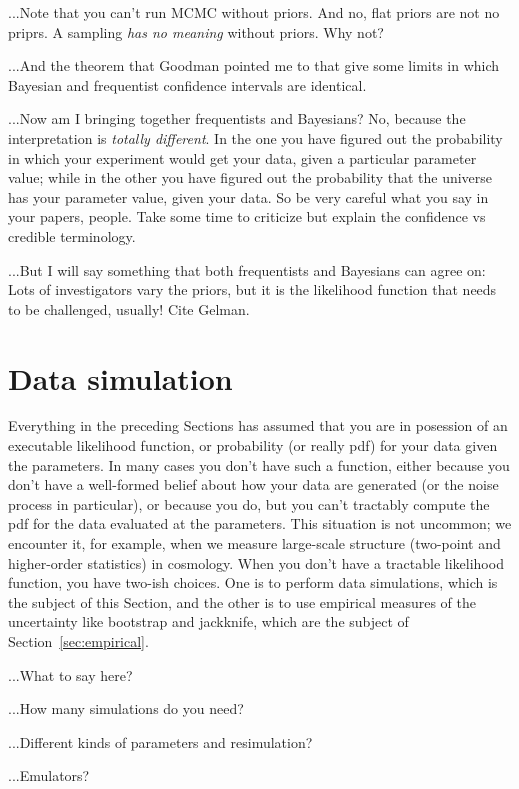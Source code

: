 \documentclass[10pt]{article}
\newcommand{\sectionname}{Section}
\begin{document}
...Note that you can't run MCMC without priors. And no, flat priors are not no
priprs. A sampling \emph{has no meaning} without priors. Why not?

...And the theorem that Goodman pointed me to that give some limits in which
Bayesian and frequentist confidence intervals are identical.

...Now am I bringing together frequentists and Bayesians? No, because the
interpretation is \emph{totally different}. In the one you have figured out the
probability in which your experiment would get your data, given a particular
parameter value; while in the other you have figured out the probability that
the universe has your parameter value, given your data. So be very careful
what you say in your papers, people. Take some time to criticize but explain the
confidence vs credible terminology.

...But I will say something that both frequentists and Bayesians can agree on:
Lots of investigators vary the priors, but it is the likelihood function
that needs to be challenged, usually! Cite Gelman.

\section{Data simulation}\label{sec:simulation}

Everything in the preceding \sectionname s has assumed that you are in posession
of an executable likelihood function, or probability (or really pdf)
for your data given the parameters.
In many cases you don't have such a function, either because you don't have
a well-formed belief about how your data are generated (or the noise process
in particular), or because you do, but you can't tractably compute the
pdf for the data evaluated at the parameters.
This situation is not uncommon; we encounter it, for example,
when we measure large-scale structure (two-point and higher-order statistics)
in cosmology.
When you don't have a tractable likelihood function, you have two-ish choices.
One is to perform data simulations, which is the subject of this \sectionname,
and the other is to use empirical measures of the uncertainty like bootstrap and
jackknife, which are the subject of \sectionname~\ref{sec:empirical}.

...What to say here?

...How many simulations do you need?

...Different kinds of parameters and resimulation?

...Emulators?
\end{document}
